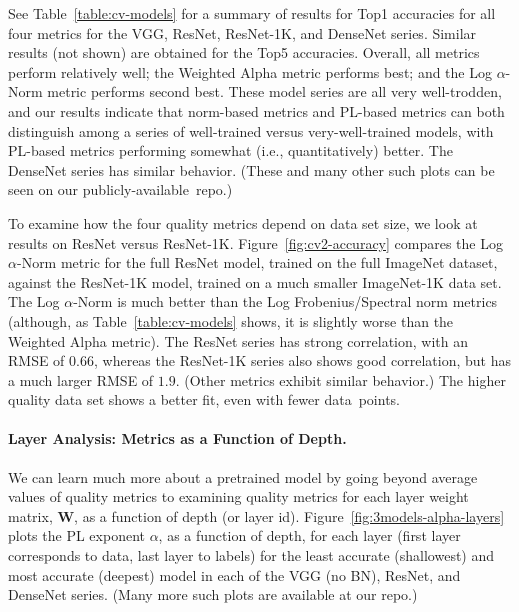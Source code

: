 See Table~\ref{table:cv-models} for a summary of results for Top1 accuracies for all four metrics for the VGG, ResNet, ResNet-1K, and DenseNet series.
Similar results (not shown) are obtained for the Top5 accuracies.
Overall, all metrics perform relatively well; the Weighted Alpha metric performs best; and the Log $\alpha$-Norm metric performs second best.
These model series are all very well-trodden, and our results indicate that norm-based metrics and PL-based metrics can both distinguish among a series of well-trained versus very-well-trained models, with PL-based metrics performing somewhat (i.e., quantitatively) better.
The DenseNet series has similar behavior.
(These and many other such plots can be seen on our publicly-available~repo.)


To examine how the four quality metrics depend on data set size, we look at results on ResNet versus ResNet-1K.
Figure~\ref{fig:cv2-accuracy} compares the Log $\alpha$-Norm metric for the full ResNet model, trained on the full ImageNet dataset, against the ResNet-1K model, trained on a much smaller ImageNet-1K data set.
The Log $\alpha$-Norm is much better than the Log Frobenius/Spectral norm metrics (although, as Table~\ref{table:cv-models} shows, it is slightly worse than the Weighted Alpha metric).
The ResNet series has strong correlation, with an RMSE of $0.66$, whereas the ResNet-1K series also shows good correlation, but has a much larger RMSE of $1.9$.
(Other metrics exhibit similar behavior.)
The higher quality data set shows a better fit, even with fewer data~points.


\paragraph{Layer Analysis: Metrics as a Function of Depth.}

We can learn much more about a pretrained model by going beyond average values of quality metrics to examining quality metrics for each layer weight matrix, $\mathbf{W}$, as a function of depth (or layer id).  
Figure~\ref{fig:3models-alpha-layers} plots the PL exponent $\alpha$, as a function of depth, for each layer (first layer corresponds to data, last layer to labels) for the least accurate (shallowest) and most accurate (deepest) model in each of the VGG (no BN), ResNet, and DenseNet series.
(Many more such plots are available at our repo.)

